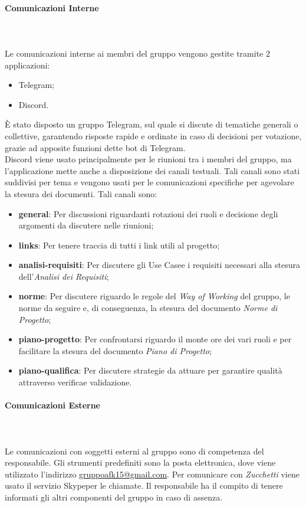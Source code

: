\paragraph{Comunicazioni Interne}\mbox{} \\ \mbox{} \\
Le comunicazioni interne ai membri del gruppo vengono gestite  tramite 2 applicazioni:
\begin{itemize}
	\item Telegram\glo;
	\item Discord\glo.
\end{itemize}
È stato disposto un gruppo Telegram, sul quale si discute di tematiche generali o collettive, garantendo risposte rapide e ordinate in caso di decisioni per votazione, grazie ad apposite funzioni dette bot di Telegram\glo. \\
Discord viene usato principalmente per le riunioni tra i membri del gruppo, ma l'applicazione mette anche a disposizione dei canali testuali. Tali canali sono stati suddivisi per tema e vengono usati per le comunicazioni specifiche per agevolare la stesura dei documenti. Tali canali sono:
\begin{itemize}
	\item \textbf{general}: Per discussioni riguardanti rotazioni dei ruoli e decisione degli argomenti da discutere nelle riunioni;
	\item \textbf{links}: Per tenere traccia di tutti i link utili al progetto;
	\item \textbf{analisi-requisiti}: Per discutere gli Use Case\glo e i requisiti necessari alla stesura dell'\textit{Analisi dei Requisiti};
	\item \textbf{norme}: Per discutere riguardo le regole del \textit{Way of Working} del gruppo, le norme da seguire e, di conseguenza, la stesura del documento \textit{Norme di Progetto}\glo;
	\item \textbf{piano-progetto}: Per confrontarsi riguardo il monte ore dei vari ruoli e per facilitare la stesura del documento \textit{Piano di Progetto};
	\item \textbf{piano-qualifica}: Per discutere strategie da attuare per garantire qualità attraverso verifica\glo e validazione\glo.
\end{itemize}
\paragraph{Comunicazioni Esterne}\mbox{} \\ \mbox{} \\
Le comunicazioni con soggetti esterni al gruppo sono di competenza del responsabile. Gli strumenti predefiniti sono la posta elettronica, dove viene utilizzato l'indirizzo \href{mailto:gruppoafk15@gmail.com}{gruppoafk15@gmail.com}.
Per comunicare con \textit{Zucchetti} viene usato il servizio Skype\glo per le chiamate. Il responsabile ha il compito di tenere informati gli altri componenti del gruppo in caso di assenza.

